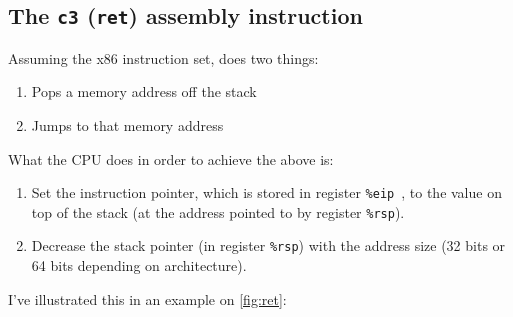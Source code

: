 \subsection{The \texttt{c3} (\texttt{ret}) assembly instruction}

Assuming the x86 instruction set,  does two things:

\begin{enumerate}
  \item Pops a memory address off the stack
  \item Jumps to that memory address
\end{enumerate}

What the CPU does in order to achieve the above is:

\begin{enumerate}
  \item Set the instruction pointer, which is stored in register \texttt{\%eip}~\cite{x86-control-flow}, to the value on top of the stack (at the address pointed to by register \texttt{\%rsp}).
  \item Decrease the stack pointer (in register \texttt{\%rsp}) with the address size (32 bits or 64 bits depending on architecture).
\end{enumerate}

I've illustrated this in an example on \autoref{fig:ret}:

